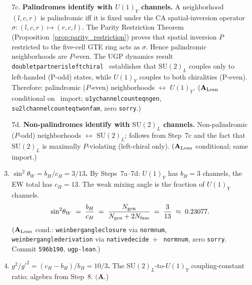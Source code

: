 \documentclass[11pt]{article}
\theoremstyle{remark}
\newcommand{\Ngen}{N_{\rm gen}}
\newcommand{\Nfam}{N_{\rm fam}}
\newcommand{\bH}{b_H}
\newcommand{\cH}{c_H}
\newcommand{\lean}[1]{%
  \penalty-100
  \begingroup\def\_{\textunderscore\allowbreak}\texttt{#1}\endgroup}
\newcommand{\sinwsq}{\sin^2\!\theta_W}
\newcommand{\CatA}{\textbf{A}}
\newcommand{\CatAL}{\ensuremath{\textbf{A}_{\rm Lean}}}
\begin{document}
\begin{tcolorbox}[colback=blue!3,colframe=blue!40!black,
  title={\textbf{The Ten-Step Chain}},fonttitle=\bfseries,
  left=8pt,right=8pt,top=5pt,bottom=5pt]
\begin{enumerate}[
  label=\textbf{Step \arabic*.},
  leftmargin=!,labelwidth=!,widest=8,
  align=left,itemsep=0.35em]
\item[7c.] \textbf{Palindromes identify with $U(1)_Y$ channels.}\quad
  A neighborhood $(l,c,r)$ is palindromic iff it is fixed under the CA spatial-inversion
  operator $\sigma: (l,c,r) \mapsto (r,c,l)$.  The Parity Restriction Theorem
  (Proposition~\ref{prop:parity_restriction}) proves that spatial inversion $P$ restricted to the
  five-cell GTE ring acts as $\sigma$.  Hence palindromic neighborhoods are $P$-even.
  The UGP dynamics result \lean{doublet\_partner\_is\_left\_chiral}~\cite{Spivack2026_UGPDynamics}
  establishes that $\mathrm{SU}(2)_L$ couples only to left-handed (P-odd) states, while
  $U(1)_Y$ couples to both chiralities (P-even).
  Therefore: palindromic ($P$-even) neighborhoods $\leftrightarrow$ $U(1)_Y$.
  $(\CatAL$ conditional on~\cite{Spivack2026_UGPDynamics} import;
  \lean{u1y\_channel\_count\_eq\_ngen}, \lean{su2l\_channel\_count\allowbreak\_eq\_two\_nfam},
  zero \texttt{sorry}.)

\item[7d.] \textbf{Non-palindromes identify with $\mathrm{SU}(2)_L$ channels.}\quad
  Non-palindromic ($P$-odd) neighborhoods $\leftrightarrow$ $\mathrm{SU}(2)_L$; follows from Step~7c
  and the fact that $\mathrm{SU}(2)_L$ is maximally $P$-violating (left-chiral only).
  $(\CatAL$ conditional; same import.)

\item \textbf{$\sinwsq = \bH/\cH = 3/13$.}\quad
  By Steps~7a--7d: $U(1)_Y$ has $\bH = 3$ channels, the EW total has $\cH = 13$.
  The weak mixing angle is the fraction of $U(1)_Y$ channels.
  \begin{equation}
    \sinwsq \;=\; \frac{\bH}{\cH} \;=\; \frac{\Ngen}{\Ngen + 2\Nfam}
    \;=\; \frac{3}{13} \;\approx\; 0.23077.
    \label{eq:weinberg_main}
  \end{equation}
  $(\CatAL$ cond.: \lean{weinberg\_angle\_closure} via \lean{norm\_num},
  \lean{weinberg\_angle\_derivation} via \lean{native\_decide}~+~\lean{norm\_num},
  zero \texttt{sorry}.  Commit \texttt{596b190}, \texttt{ugp-lean}.)

\item \textbf{$g^2/g'^2 = (\cH - \bH)/\bH = 10/3$.}\quad
  The $\mathrm{SU}(2)_L$-to-$U(1)_Y$ coupling-constant ratio; algebra from Step~8.
  $(\CatA$.)

\end{enumerate}
\end{tcolorbox}

\medskip
\end{document}
